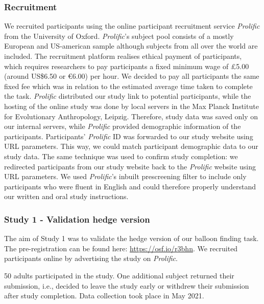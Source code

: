 \documentclass[
  english,
  man,floatsintext]{apa6}
\begin{document}
\hypertarget{recruitment}{%
\subsubsection{Recruitment}\label{recruitment}}

We recruited participants using the online participant recruitment service \emph{Prolific} from the University of Oxford. \emph{Prolific}'s subject pool consists of a mostly European and US-american sample although subjects from all over the world are included. The recruitment platform realises ethical payment of participants, which requires researchers to pay participants a fixed minimum wage of £5.00 (around US\$6.50 or €6.00) per hour. We decided to pay all participants the same fixed fee which was in relation to the estimated average time taken to complete the task.
\emph{Prolific} distributed our study link to potential participants, while the hosting of the online study was done by local servers in the Max Planck Institute for Evolutionary Anthropology, Leipzig. Therefore, study data was saved only on our internal servers, while \emph{Prolific} provided demographic information of the participants.
Participants' \emph{Prolific} ID was forwarded to our study website using URL parameters. This way, we could match participant demographic data to our study data. The same technique was used to confirm study completion: we redirected participants from our study website back to the \emph{Prolific} website using URL parameters.
We used \emph{Prolific}'s inbuilt prescreening filter to include only participants who were fluent in English and could therefore properly understand our written and oral study instructions.

\hypertarget{study-1---validation-hedge-version}{%
\subsubsection{Study 1 - Validation hedge version}\label{study-1---validation-hedge-version}}

The aim of Study 1 was to validate the hedge version of our balloon finding task. The pre-registration can be found here: \url{https://osf.io/r3bhn}. We recruited participants online by advertising the study on \emph{Prolific}.

50 adults participated in the study. One additional subject returned their submission, i.e., decided to leave the study early or withdrew their submission after study completion. Data collection took place in May 2021.
\end{document}
